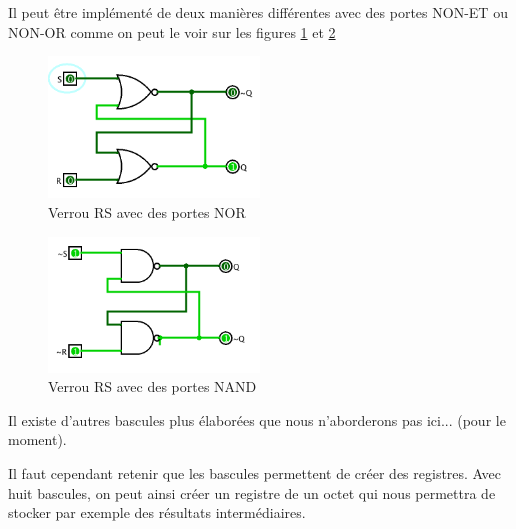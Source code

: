 \documentclass{book}
\theoremstyle{definition}
\theoremstyle{definition}
\begin{document}
Il peut être implémenté de deux manières différentes avec des portes NON-ET ou NON-OR comme on peut le voir sur les figures \ref{fig:vRS_NOR} et \ref{fig:vRS_NAND}

\begin{figure}
\includegraphics[width=0.5\textwidth]{media/SysLogiques/verrouRS_NOR.png}
    \centering
    \caption{Verrou RS avec des portes NOR}
    \label{fig:vRS_NOR}
\end{figure}

\begin{figure}
\includegraphics[width=0.5\textwidth]{media/SysLogiques/verrouRS_NAND.png}
    \centering
    \caption{Verrou RS avec des portes NAND}
    \label{fig:vRS_NAND}
\end{figure}


Il existe d'autres bascules plus élaborées que nous n'aborderons pas ici... (pour le moment).

Il faut cependant retenir que les bascules permettent de créer des registres. Avec huit bascules, on peut ainsi créer un registre de un octet qui nous permettra de stocker par exemple des résultats intermédiaires.
\end{document}
